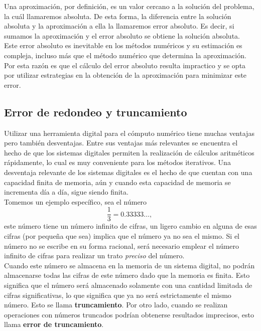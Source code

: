 Una aproximación, por definición, es un valor cercano a la solución del problema, la cuál llamaremos absoluta. De esta forma, la diferencia entre la solución
absoluta y la aproximación a ella la llamaremos error absoluto. Es decir, si sumamos la aproximación y el error absoluto se obtiene la solución absoluta.\\

Este error absoluto es inevitable en los métodos numéricos y su estimación es compleja, incluso más que el método numérico que determina la aproximación. Por 
esta razón es que el cálculo del error absoluto resulta impractico y se opta por utilizar estrategias en la obtención de la aproximación para minimizar este 
error.

\subsection{Error de redondeo y truncamiento}

Utilizar una herramienta digital para el cómputo numérico tiene muchas ventajas pero también desventajas. Entre sus ventajas más relevantes se encuentra el 
hecho de que los sistemas digitales permiten la realización de cálculos aritméticos rápidamente, lo cual es muy conveniente para los métodos iterativos. 
Una desventaja relevante de los sistemas digitales es el hecho de que cuentan con una capacidad finita de memoria, aún y cuando esta capacidad de memoria se 
incrementa día a día, sigue siendo finita.\\ 

Tomemos un ejemplo específico, sea el número
\[ \dfrac{1}{3} = 0.33333\dots, \ \]
este número tiene un número infinito de cifras, un ligero cambio en alguna de esas cifras (por pequeña que sea) implica que el número ya no sea el mismo. 
Si el número no se escribe en su forma racional, será necesario emplear el número infinito de cifras para realizar un trato \textit{preciso} del número. \\

Cuando este número se almacena en la memoria de un sistema digital, no podrán almacenarse todas las cifras de este número dado que la memoria es finita. 
Esto significa que el número será almacenado solamente con una cantidad limitada de cifras significativas, lo que significa que ya no será estrictamente 
el mismo número. Esto se llama \textbf{truncamiento}.
Por otro lado, cuando se realizan operaciones con números truncados podrían obtenerse resultados imprecisos, esto llama \textbf{error de truncamiento}.\\

